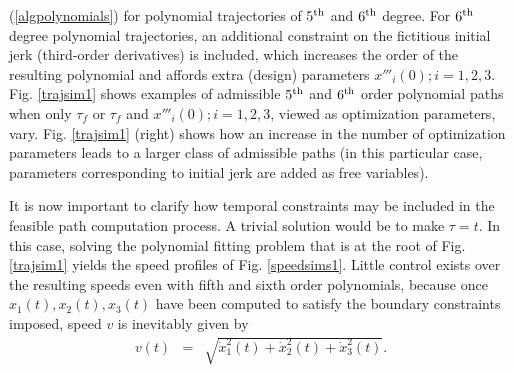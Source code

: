 \documentclass[]{aiaa-tc}%
\begin{document}
(\ref{algpolynomials}) for polynomial trajectories of $5^{{\rm
th}}$ and $6^{{\rm th}}$ degree. For $6^{{\rm th}}$ degree
polynomial trajectories,  an additional constraint on the
fictitious initial jerk (third-order derivatives) is included,
which increases the order of the resulting polynomial and affords
extra (design) parameters $ x'''_{i}(0); i = 1,2,3$.  Fig.
\ref{trajsim1} shows examples of admissible $5^{{\rm th}}$ and
$6^{{\rm th}}$ order polynomial paths when only $\tau_f$ or
$\tau_f$ and $x'''_{i}(0); i = 1,2,3$, viewed as optimization
parameters, vary. Fig. \ref{trajsim1} (right) shows how an
increase in the number of optimization parameters leads to a
larger class of admissible paths (in this particular case,
parameters corresponding to initial jerk are added as free
variables).








It is now important to clarify how temporal constraints may be
included in the feasible path computation process. A trivial
solution would be to make $\tau=t$. In this case, solving the
polynomial fitting problem that is at the root of Fig.
\ref{trajsim1} yields the speed profiles of Fig. \ref{speedsims1}.
Little control exists over the resulting speeds even with fifth
and sixth order polynomials, because once $x_1(t), x_2(t), x_3(t)$
have been computed to satisfy the boundary constraints imposed,
speed $v$ is inevitably given by
\begin{eqnarray}
\label{velocity} v(t) &=& \sqrt{ \dot{x}_{1}^2(t) +
\dot{x}^2_{2}(t) + \dot{x}^2_{3}(t)}.
\end{eqnarray}
\end{document}
